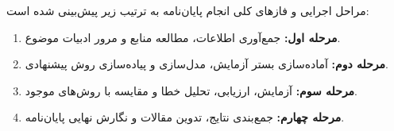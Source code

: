 
مراحل اجرایی و فازهای کلی انجام پایان‌نامه به ترتیب زیر پیش‌بینی شده است:

\begin{enumerate}[label=\arabic*-, leftmargin=1.5cm]
    \item \textbf{مرحله اول:} جمع‌آوری اطلاعات، مطالعه منابع و مرور ادبیات موضوع.
    \item \textbf{مرحله دوم:} آماده‌سازی بستر آزمایش، مدل‌سازی و پیاده‌سازی روش پیشنهادی.
    \item \textbf{مرحله سوم:} آزمایش، ارزیابی، تحلیل خطا و مقایسه با روش‌های موجود.
    \item \textbf{مرحله چهارم:} جمع‌بندی نتایج، تدوین مقالات و نگارش نهایی پایان‌نامه.
\end{enumerate}
